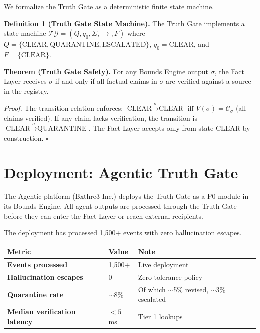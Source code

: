\documentclass[12pt]{article}
\begin{document}
We formalize the Truth Gate as a deterministic finite state machine.

\bigskip

\noindent\textbf{Definition 1 (Truth Gate State Machine).}
The Truth Gate implements a state machine $\mathcal{TG} = (Q, q_0, \Sigma, \rightarrow, F)$ where $Q = \{\text{CLEAR}, \text{QUARANTINE}, \text{ESCALATED}\}$, $q_0 = \text{CLEAR}$, and $F = \{\text{CLEAR}\}$.

\bigskip

\noindent\textbf{Theorem (Truth Gate Safety).}
For any Bounds Engine output $\sigma$, the Fact Layer receives $\sigma$ if and only if all factual claims in $\sigma$ are verified against a source in the registry.

\textit{Proof.} The transition relation enforces: $\text{CLEAR} \xrightarrow{\sigma} \text{CLEAR}$ iff $V(\sigma) = \mathcal{C}_\sigma$ (all claims verified). If any claim lacks verification, the transition is $\text{CLEAR} \xrightarrow{\sigma} \text{QUARANTINE}$. The Fact Layer accepts only from state $\text{CLEAR}$ by construction. $\square$

\section{Deployment: Agentic Truth Gate}
\label{sec:deployment}

The Agentic platform (Bxthre3 Inc.) deploys the Truth Gate as a P0 module in its Bounds Engine. All agent outputs are processed through the Truth Gate before they can enter the Fact Layer or reach external recipients.

The deployment has processed 1,500+ events with zero hallucination escapes.

\begin{center}
\begin{tabular}{>{\bfseries}p{4cm} p{3cm} p{3cm}}
\toprule
\textbf{Metric} & \textbf{Value} & \textbf{Note} \\
\midrule
Events processed & 1,500+ & Live deployment \\
\midrule
Hallucination escapes & 0 & Zero tolerance policy \\
\midrule
Quarantine rate & $\sim$8\% & Of which $\sim$5\% revised, $\sim$3\% escalated \\
\midrule
Median verification latency & $<5$\,ms & Tier 1 lookups \\
\bottomrule
\end{tabular}
\end{center}
\end{document}
